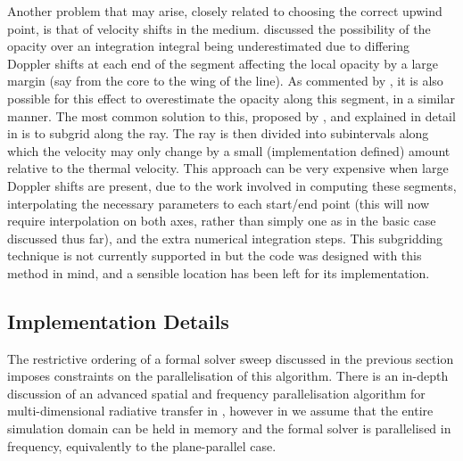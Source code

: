Another problem that may arise, closely related to choosing the correct upwind point, is that of velocity shifts in the medium.
\citet{VanNoort2002} discussed the possibility of the opacity over an integration integral being underestimated due to differing Doppler shifts at each end of the segment affecting the local opacity by a large margin (say from the core to the wing of the line).
As commented by \citet{Ibgui2013}, it is also possible for this effect to overestimate the opacity along this segment, in a similar manner.
The most common solution to this, proposed by \citet{VanNoort2002}, and explained in detail in \citet{Ibgui2013} is to subgrid along the ray.
The ray is then divided into subintervals along which the velocity may only change by a small (implementation defined) amount relative to the thermal velocity.
This approach can be very expensive when large Doppler shifts are present, due to the work involved in computing these segments, interpolating the necessary parameters to each start/end point (this will now require interpolation on both axes, rather than simply one as in the basic case discussed thus far), and the extra numerical integration steps.
This subgridding technique is not currently supported in \Lw{} but the code was designed with this method in mind, and a sensible location has been left for its implementation.

\subsection{Implementation Details}

The restrictive ordering of a formal solver sweep discussed in the previous section imposes constraints on the parallelisation of this algorithm.
There is an in-depth discussion of an advanced spatial and frequency parallelisation algorithm for multi-dimensional radiative transfer in \citet{Stepan2013}, however in \Lw{} we assume that the entire simulation domain can be held in memory and the formal solver is parallelised in frequency, equivalently to the plane-parallel case.

